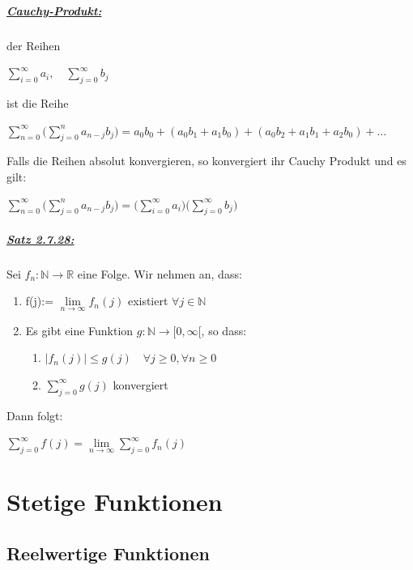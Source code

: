 \documentclass[8pt]{extreport}
\begin{document}
\paragraph{\underline{Cauchy-Produkt:}} der Reihen
\begin{center}
$\displaystyle\sum_{i = 0}^{\infty}a_i, \quad \displaystyle\sum_{j=0}^{\infty} b_j$
\end{center}
ist die Reihe
\begin{center}
$\displaystyle\sum_{n=0}^{\infty}\bigg(\displaystyle\sum_{j=0}^{n}a_{n-j}b_j \bigg) = a_0b_0 + (a_0b_1 + a_1b_0) +(a_0b_2 + a_1b_1 + a_2b_0) + \dots$
\end{center}
Falls die Reihen absolut konvergieren, so konvergiert ihr Cauchy Produkt und es gilt:
\begin{center}
$\displaystyle\sum_{n=0}^{\infty}\bigg( \displaystyle\sum_{j=0} ^{n}a_{n-j}b_j \bigg) = \bigg( \displaystyle\sum_{i=0}^{\infty}a_i \bigg) \bigg(\displaystyle\sum_{j=0}^{\infty}b_j\bigg)$
\end{center}
\paragraph{\underline{Satz 2.7.28:}} Sei $f_n : \mathbb{N} \rightarrow \mathbb{R}$ eine Folge. Wir nehmen an, dass:
\begin{enumerate}
\item f(j):= $\lim\limits_{n \to  \infty}f_n(j)$ existiert    $\forall j \in \mathbb{N}$
\item Es gibt eine Funktion $g: \mathbb{N} \rightarrow [0,\infty [$, so dass:
\begin{enumerate}
\item $ |f_n(j)| \leq g(j) \quad \forall j \geq 0 , \forall n \geq 0$
\item $\displaystyle\sum_{j=0}^{\infty}g(j)$ konvergiert
\end{enumerate}
\end{enumerate}
Dann folgt:
\begin{center}
$\displaystyle\sum_{j=0}^{\infty} f(j) = \lim\limits_{n \to \infty}\displaystyle\sum_{j=0}^{\infty} f_n(j)$
\end{center}
\chapter{Stetige Funktionen}
\section{Reelwertige Funktionen}
\end{document}
